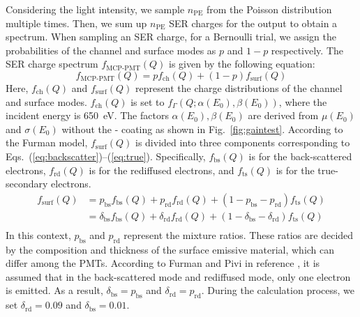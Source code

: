 Considering the light intensity, we sample $n_{\mathrm{PE}}$ from the Poisson distribution multiple times. Then, we sum up $n_{\mathrm{PE}}$ SER charges for the output to obtain a spectrum. When sampling an SER charge, for a Bernoulli trial, we assign the probabilities of the channel and surface modes as $p$ and $1 - p$ respectively. The SER charge spectrum $f_{\text{MCP-PMT}}(Q)$ is given by the following equation:
\begin{equation}
	\label{eq:convolution}
	f_{\text{MCP-PMT}}(Q) = p f_{\mathrm{ch}}(Q)+(1 - p) f_{\mathrm{surf}}(Q)
\end{equation}
Here, $f_{\mathrm{ch}}(Q)$ and $f_{\mathrm{surf}}(Q)$ represent the charge distributions of the channel and surface modes. $f_{\mathrm{ch}}(Q)$ is set to \(f_\Gamma(Q; \alpha(E_0), \beta(E_0))\), where the incident energy is \SI{650}{eV}. The factors \(\alpha(E_0), \beta(E_0)\) are derived from $\mu(E_0)$ and $\sigma(E_0)$ without the - coating as shown in Fig.~\ref{fig:gaintest}.
According to the Furman model, $f_{\mathrm{surf}}(Q)$ is divided into three components corresponding to Eqs.~(\ref{eq:backscatter})--(\ref{eq:true}). Specifically, $f_{\mathrm{bs}}(Q)$ is for the back-scattered electrons, $f_{\mathrm{rd}}(Q)$ is for the rediffused electrons, and $f_{\mathrm{ts}}(Q)$ is for the true-secondary electrons.
\begin{equation}
	\label{eq:surface_3}
	\begin{aligned}
		f_{\mathrm{surf}}(Q) & = p_{\mathrm{bs}} f_{\mathrm{bs}}(Q) + p_{\mathrm{rd}} f_{\mathrm{rd}}(Q) + (1- p_{\mathrm{bs}} - p_{\mathrm{rd}}) f_{\mathrm{ts}}(Q)                     \\
		                     & = \delta_{\mathrm{bs}} f_{\mathrm{bs}}(Q) + \delta_{\mathrm{rd}} f_{\mathrm{rd}}(Q) + (1- \delta_{\mathrm{bs}} - \delta_{\mathrm{rd}}) f_{\mathrm{ts}}(Q) \\
	\end{aligned}
\end{equation}
In this context, $p_{\mathrm{bs}}$ and $p_{\mathrm{rd}}$ represent the mixture ratios. These ratios are decided by the composition and thickness of the surface emissive material, which can differ among the PMTs. According to Furman and Pivi in reference \cite{2002Probabilistic}, it is assumed that in the back-scattered mode and rediffused mode, only one electron is emitted. As a result, $\delta_{\mathrm{bs}} = p_{\mathrm{bs}}$ and $\delta_{\mathrm{rd}} = p_{\mathrm{rd}}$. During the calculation process, we set $\delta_{\mathrm{rd}} = 0.09$ and $\delta_{\mathrm{bs}} = 0.01$.
